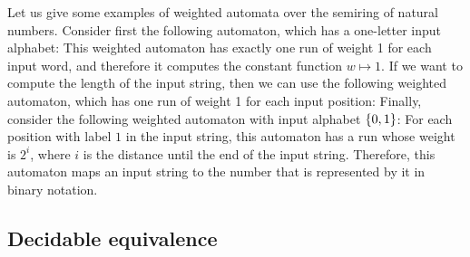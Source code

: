 \begin{myexample} \label{ex:weighted-automata-nat}
    Let us give some examples of weighted automata over the semiring of natural numbers. Consider first the following automaton, which has a one-letter input alphabet:
    This weighted automaton 
    has exactly one run of weight 1 for each input word, and therefore it computes the constant function $w \mapsto 1$. If we want to compute the length of the input string, then we can use the following weighted automaton, which has one run of weight 1 for each input position:
Finally, consider the following weighted automaton with input alphabet $\{0,1\}$:
    For each position with label $1$ in the input string, this automaton has a run whose weight is $2^i$, where $i$ is the distance until the end of the input string. Therefore, this automaton maps an input string to the number that is represented by it in binary notation.
\end{myexample}






\subsection{Decidable equivalence}
\label{sec:decidable-equivalence-rational-functions}

